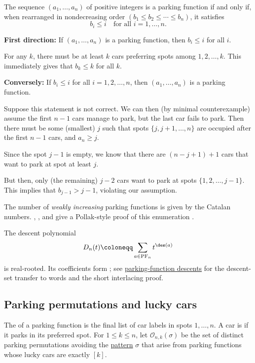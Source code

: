 \begin{theorem}
The sequence $(a_1, \dotsc, a_n)$ of positive integers is a
parking function if and only if, when rearranged
in nondecreasing order
$(b_1 \leq b_2 \leq \dotsb \leq b_n)$, it satisfies
\[
b_i \leq i \quad \text{for all } i = 1, \dotsc, n.
\]
\end{theorem}
\begin{proof*}
\textbf{First direction:}
If $(a_1, \dotsc, a_n)$ is a parking function, then $b_i \leq i$ for all $i$.

For any $k$, there must be at least $k$ cars preferring spots among $1,2,\dotsc,k$.
This immediately gives that $b_k \leq k$ for all $k$.

\textbf{Conversely:} If $b_i \leq i$ for all $i = 1,2,\dotsc,n$,
then $(a_1, \dotsc, a_n)$ is a parking function.

Suppose this statement is not correct. We can then (by minimal counterexample)
assume the first $n-1$ cars manage to park, but the last car fails to park.
Then there must be some (smallest) $j$ such that spots $\{j,j+1,\dotsc,n\}$
are occupied after the first $n-1$ cars, and $a_n \geq j$.

Since the spot $j-1$ is empty, we know that there are $(n-j+1)+1$
cars that want to park at spot at least $j$.

But then, only (the remaining) $j-2$ cars want to park at spots $\{1,2,\dotsc,j-1\}$.
This implies that $b_{j-1} > j-1$, violating our assumption.
\end{proof*}


The number of \emph{weakly increasing} parking functions is given by the Catalan numbers.
, ,
and  give a Pollak-style proof of this enumeration
\cite{HarrisMoriWilson2025x}.


The descent polynomial
\[
 D_n(t) \coloneqq \sum_{a\in\mathrm{PF}_n}t^{\des(a)}
\]
is real-rooted.  Its coefficients form ; see
\hyperref[parkingFunctionDescentsRealRooted]{parking-function descents} for
the descent-set transfer to words and the short interlacing proof.


\subsection[parkingPermutationLuckyPatterns]{Parking permutations and lucky cars}

The  of a parking function is the final list of
car labels in spots $1,\dotsc,n$. A car is  if it parks in its
preferred spot. For $1\leq k\leq n$, let $\mathcal O_{n,k}(\sigma)$ be the
set of distinct parking permutations avoiding the
\hyperref[permutationPattern]{pattern} $\sigma$ that arise from parking
functions whose lucky cars are exactly $[k]$.


